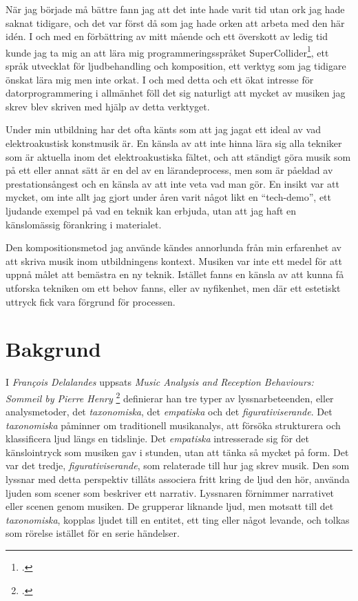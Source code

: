 \documentclass{article}
\begin{document}
När jag började må bättre fann jag att det inte hade varit tid utan ork jag hade saknat tidigare, och det var
först då som jag hade orken att arbeta med den här idén. I och med en förbättring av
mitt mående och ett överskott av ledig tid kunde jag ta mig an att lära mig programmeringsspråket 
SuperCollider\footcite{sc}, ett språk utvecklat för ljudbehandling och
komposition, ett verktyg som jag tidigare önskat lära mig men inte orkat. I och med detta och ett ökat
intresse för datorprogrammering i allmänhet föll det sig naturligt att mycket av musiken jag skrev blev
skriven med hjälp av detta verktyget.

Under min utbildning har det ofta känts som att jag jagat ett ideal av vad elektroakustisk konstmusik är. En
känsla av att inte hinna lära sig alla tekniker som är aktuella inom det elektroakustiska fältet, och att
ständigt göra musik som på ett eller annat sätt är en del av en lärandeprocess, men som är påeldad av
prestationsångest och en känsla av att inte veta vad man gör. En insikt var att mycket, om inte allt jag gjort
under åren varit något likt en ``tech-demo'', ett ljudande exempel på vad en teknik kan erbjuda, utan att jag
haft en känslomässig förankring i materialet.

Den kompositionsmetod jag använde kändes annorlunda från min erfarenhet av att skriva musik inom
utbildningens kontext. Musiken var inte ett medel för att uppnå målet att bemästra en ny teknik. Istället
fanns en känsla av att kunna få utforska tekniken om ett behov fanns, eller av nyfikenhet, men där ett
estetiskt uttryck fick vara förgrund för processen. 




\section{Bakgrund}
I \emph{François Delalandes} uppsats \emph{Music Analysis and Reception Behaviours: Sommeil by Pierre Henry}
\footcite[26, 38, 52]{Delalande1998} definierar han tre typer av lyssnarbeteenden, eller analysmetoder, det
\emph{taxonomiska}, det \emph{empatiska} och det \emph{figurativiserande}. Det \emph{taxonomiska} påminner om
traditionell musikanalys, att försöka strukturera och klassificera ljud längs en tidslinje. Det
\emph{empatiska} intresserade sig för det känslointryck som musiken gav i stunden, utan att tänka så mycket på
form. Det var det tredje, \emph{figurativiserande}, som relaterade till hur jag skrev musik. Den som lyssnar
med detta perspektiv tillåts associera fritt kring de ljud den hör, använda ljuden som scener som beskriver
ett narrativ. Lyssnaren förnimmer narrativet eller scenen genom musiken. De grupperar liknande ljud,
men motsatt till det \emph{taxonomiska}, kopplas ljudet till en entitet, ett ting eller något levande, och
tolkas som rörelse istället för en serie händelser.
\end{document}
